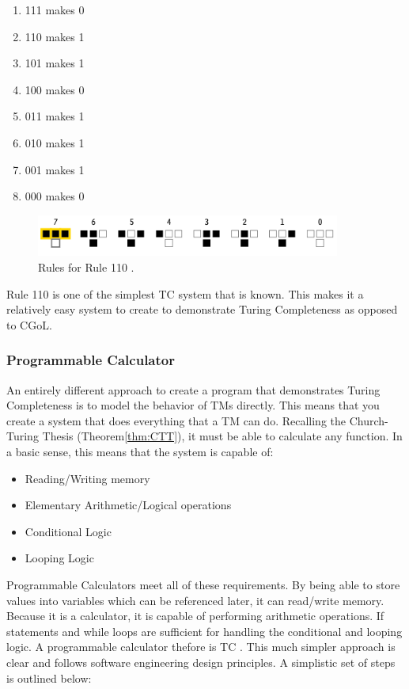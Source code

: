 \begin{enumerate}
    \item 111 makes 0
    \item 110 makes 1
    \item 101 makes 1
    \item 100 makes 0
    \item 011 makes 1
    \item 010 makes 1
    \item 001 makes 1
    \item 000 makes 0
\end{enumerate}

\begin{figure}[htb]
    \centering
    \includegraphics[width=10cm]{images/rule110.png}
       \caption{Rules for Rule 110 \cite{Rule110Img}.}
           \label{fig:Rule110}
\end{figure}

Rule 110 is one of the simplest TC system that is known.
This makes it a relatively easy system to create to demonstrate Turing Completeness as opposed to CGoL.

\subsubsection{Programmable Calculator}\label{subsubsec:ProgCalc}

An entirely different approach to create a program that demonstrates Turing Completeness is to model the behavior of TMs directly.
This means that you create a system that does everything that a TM can do.
Recalling the Church-Turing Thesis (Theorem\ref{thm:CTT}), it must be able to calculate any function.
In a basic sense, this means that the system is capable of:

\begin{itemize}
    \item Reading/Writing memory
    \item Elementary Arithmetic/Logical operations
    \item Conditional Logic
    \item Looping Logic
\end{itemize}

Programmable Calculators meet all of these requirements.
By being able to store values into variables which can be referenced later, it can read/write memory.
Because it is a calculator, it is capable of performing arithmetic operations.
If statements and while loops are sufficient for handling the conditional and looping logic.
A programmable calculator thefore is TC \cite{CalcTC}.
This much simpler approach is clear and follows software engineering design principles.
A simplistic set of steps is outlined below:


